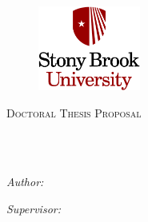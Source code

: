 \documentclass[
11pt, %
oneside, %
english, %
singlespacing, %
liststotoc, %
headsepline, %
]{MastersDoctoralThesis} %
\author{Caitao Zhan} %
\begin{document}
\frontmatter %

\pagestyle{plain} %


\begin{titlepage}
\begin{center}
\begin{figure}[!tb]
	\centering
	\includegraphics[width=0.3\textwidth]{sbu-logo.png}
	\vspace{0.2in}
\end{figure}

\textsc{\Large Doctoral Thesis Proposal}\\[0.5cm] %

\HRule \\[0.4cm] %
{\huge \bfseries \ttitle\par}\vspace{0.4cm} %
\HRule \\[1.5cm] %
 
\begin{minipage}[t]{0.4\textwidth}
\begin{flushleft} \large
\emph{Author:}\\
\href{https://caitaozhan.github.io/}{\authorname} %
\end{flushleft}
\end{minipage}
\begin{minipage}[t]{0.4\textwidth}
\begin{flushright} \large
\emph{Supervisor:} \\
\href{https://www3.cs.stonybrook.edu/~hgupta/}{\supname} %
\end{flushright}
\end{minipage}\\[3cm]
 

\end{center}
\end{titlepage}
\end{document}
